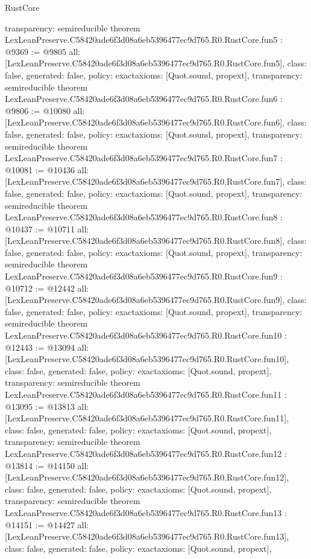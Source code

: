 \begin{lexlean}{RustCore}
\begin{coremodule}
{  transparency: semireducible
}
theorem LexLeanPreserve.C58420ade6f3d08a6eb5396477ec9d765.R0.RustCore.fun5 : @9369 := @9805 {
  all: [LexLeanPreserve.C58420ade6f3d08a6eb5396477ec9d765.R0.RustCore.fun5],
  class: false,
  generated: false,
  policy: exact{axioms: [Quot.sound, propext]},
  transparency: semireducible
}
theorem LexLeanPreserve.C58420ade6f3d08a6eb5396477ec9d765.R0.RustCore.fun6 : @9806 := @10080 {
  all: [LexLeanPreserve.C58420ade6f3d08a6eb5396477ec9d765.R0.RustCore.fun6],
  class: false,
  generated: false,
  policy: exact{axioms: [Quot.sound, propext]},
  transparency: semireducible
}
theorem LexLeanPreserve.C58420ade6f3d08a6eb5396477ec9d765.R0.RustCore.fun7 : @10081 := @10436 {
  all: [LexLeanPreserve.C58420ade6f3d08a6eb5396477ec9d765.R0.RustCore.fun7],
  class: false,
  generated: false,
  policy: exact{axioms: [Quot.sound, propext]},
  transparency: semireducible
}
theorem LexLeanPreserve.C58420ade6f3d08a6eb5396477ec9d765.R0.RustCore.fun8 : @10437 := @10711 {
  all: [LexLeanPreserve.C58420ade6f3d08a6eb5396477ec9d765.R0.RustCore.fun8],
  class: false,
  generated: false,
  policy: exact{axioms: [Quot.sound, propext]},
  transparency: semireducible
}
theorem LexLeanPreserve.C58420ade6f3d08a6eb5396477ec9d765.R0.RustCore.fun9 : @10712 := @12442 {
  all: [LexLeanPreserve.C58420ade6f3d08a6eb5396477ec9d765.R0.RustCore.fun9],
  class: false,
  generated: false,
  policy: exact{axioms: [Quot.sound, propext]},
  transparency: semireducible
}
theorem LexLeanPreserve.C58420ade6f3d08a6eb5396477ec9d765.R0.RustCore.fun10 : @12443 := @13094 {
  all: [LexLeanPreserve.C58420ade6f3d08a6eb5396477ec9d765.R0.RustCore.fun10],
  class: false,
  generated: false,
  policy: exact{axioms: [Quot.sound, propext]},
  transparency: semireducible
}
theorem LexLeanPreserve.C58420ade6f3d08a6eb5396477ec9d765.R0.RustCore.fun11 : @13095 := @13813 {
  all: [LexLeanPreserve.C58420ade6f3d08a6eb5396477ec9d765.R0.RustCore.fun11],
  class: false,
  generated: false,
  policy: exact{axioms: [Quot.sound, propext]},
  transparency: semireducible
}
theorem LexLeanPreserve.C58420ade6f3d08a6eb5396477ec9d765.R0.RustCore.fun12 : @13814 := @14150 {
  all: [LexLeanPreserve.C58420ade6f3d08a6eb5396477ec9d765.R0.RustCore.fun12],
  class: false,
  generated: false,
  policy: exact{axioms: [Quot.sound, propext]},
  transparency: semireducible
}
theorem LexLeanPreserve.C58420ade6f3d08a6eb5396477ec9d765.R0.RustCore.fun13 : @14151 := @14427 {
  all: [LexLeanPreserve.C58420ade6f3d08a6eb5396477ec9d765.R0.RustCore.fun13],
  class: false,
  generated: false,
  policy: exact{axioms: [Quot.sound, propext]},
}
\end{coremodule}
\end{lexlean}
